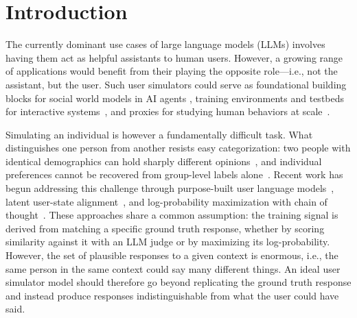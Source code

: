 \documentclass{article} %
\begin{document}
\section{Introduction}
The currently dominant use cases of large language models (LLMs) involves having them act as helpful assistants to human users. However, a growing range of applications would benefit  from their playing  the opposite role---i.e.,  not the assistant, but the user.
Such user simulators could serve as foundational building blocks for social world models in AI agents \citep{rabinowitz2018machine, collins2024building}, training environments and testbeds for interactive systems~\citep{abdulhai2025consistently, mehri2025goal}, and proxies for studying human behaviors at scale~\citep{aher2023using, park2023generative, lu2025multiturn}.

Simulating an individual is however a fundamentally difficult task. What distinguishes one person from another resists easy categorization: two people with identical demographics can hold sharply different opinions~\citep{hwang2023aligning, santurkar2023opinions}, and individual preferences cannot be recovered from group-level labels alone~\citep{ kirk2024prism, jiang2024indievalue}. Recent work has begun addressing this challenge through purpose-built user language models~\citep{naous2025flipping}, latent user-state alignment~\citep{wu2026humanlm}, and log-probability maximization with chain of thought~\citep{gandhi2026dialogue}.
These approaches share a common assumption: the training signal is derived from matching a specific ground truth response, whether by scoring similarity against it with an LLM judge or by  maximizing its log-probability. However, the set of plausible responses to a given context is enormous, i.e., the same person in the same context could say many different things. An ideal user simulator model should therefore go beyond replicating the ground truth response and instead produce responses indistinguishable from what the user {could have said}.

\end{document}
